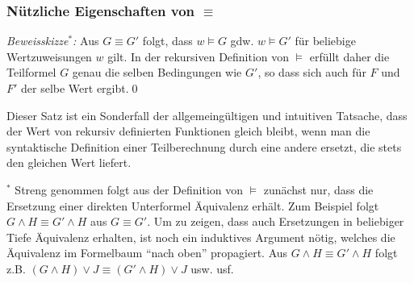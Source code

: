 \documentclass[aspectratio=1610,onlymath]{beamer}
\begin{document}
\begin{frame}\frametitle{Nützliche Eigenschaften von $\equiv$}

% 


\pause

\emph{Beweisskizze${}^*$:} Aus $G\equiv G'$ folgt, dass $w\models G$ gdw. $w\models G'$ für beliebige Wertzuweisungen $w$ gilt.
In der rekursiven Definition von $\models$ erfüllt daher die Teilformel $G$ genau die selben Bedingungen wie $G'$, so
dass sich auch für $F$ und $F'$ der selbe Wert ergibt.\qed
\bigskip

Dieser Satz ist ein Sonderfall der allgemeingültigen und intuitiven Tatsache, dass der Wert von rekursiv definierten Funktionen gleich bleibt, wenn man die syntaktische Definition einer Teilberechnung durch eine andere ersetzt, die stets den gleichen Wert liefert.
\bigskip


{\tiny ${}^*$ Streng genommen folgt aus der Definition von $\models$ zunächst nur, dass die Ersetzung einer direkten Unterformel
Äquivalenz erhält. Zum Beispiel folgt $G\wedge H\equiv G'\wedge H$ aus $G\equiv G'$. Um zu zeigen, dass auch Ersetzungen in beliebiger Tiefe Äquivalenz erhalten, ist noch ein induktives Argument nötig, welches die Äquivalenz im Formelbaum "`nach oben"' propagiert. Aus $G\wedge H\equiv G'\wedge H$ folgt z.B. $(G\wedge H)\vee J\equiv (G'\wedge H)\vee J$ usw. usf.
}

\end{frame}
\end{document}
